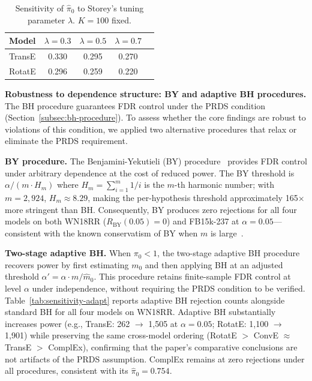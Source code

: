 \begin{table}[h]
\centering
\caption{Sensitivity of $\hat{\pi}_0$ to Storey's tuning parameter $\lambda$. $K=100$ fixed.}
\label{tab:sensitivity-lambda}
\begin{tabular}{lcccc}
\toprule
\textbf{Model} & \textbf{$\lambda=0.3$} & \textbf{$\lambda=0.5$} & \textbf{$\lambda=0.7$} \\
\midrule
TransE & 0.330 & 0.295 & 0.270 \\
RotatE & 0.296 & 0.259 & 0.220 \\
\bottomrule
\end{tabular}
\end{table}

\textbf{Robustness to dependence structure: BY and adaptive BH procedures.}
The BH procedure guarantees FDR control under the PRDS condition (Section~\ref{subsec:bh-procedure}). To assess whether the core findings are robust to violations of this condition, we applied two alternative procedures that relax or eliminate the PRDS requirement.

\textbf{BY procedure.}
The Benjamini-Yekutieli (BY) procedure~\cite{benjamini2001control} provides FDR control under arbitrary dependence at the cost of reduced power.
The BY threshold is $\alpha / (m \cdot H_m)$ where $H_m = \sum_{i=1}^m 1/i$ is the $m$-th harmonic number; with $m = 2{,}924$, $H_m \approx 8.29$, making the per-hypothesis threshold approximately 165$\times$ more stringent than BH.
Consequently, BY produces zero rejections for all four models on both WN18RR ($R_{\text{BY}}(0.05) = 0$) and FB15k-237 at $\alpha = 0.05$---consistent with the known conservatism of BY when $m$ is large~\cite{benjamini2001control}.

\textbf{Two-stage adaptive BH.}
When $\pi_0 < 1$, the two-stage adaptive BH procedure~\cite{benjamini2006adaptive} recovers power by first estimating $m_0$ and then applying BH at an adjusted threshold $\alpha' = \alpha \cdot m / \hat{m}_0$.
This procedure retains finite-sample FDR control at level $\alpha$ under independence, without requiring the PRDS condition to be verified.
Table~\ref{tab:sensitivity-adapt} reports adaptive BH rejection counts alongside standard BH for all four models on WN18RR.
Adaptive BH substantially increases power (e.g., TransE: 262 $\to$ 1{,}505 at $\alpha = 0.05$; RotatE: 1{,}100 $\to$ 1{,}901) while preserving the same cross-model ordering (RotatE $>$ ConvE $\approx$ TransE $>$ ComplEx), confirming that the paper's comparative conclusions are not artifacts of the PRDS assumption.
ComplEx remains at zero rejections under all procedures, consistent with its $\hat{\pi}_0 = 0.754$.

